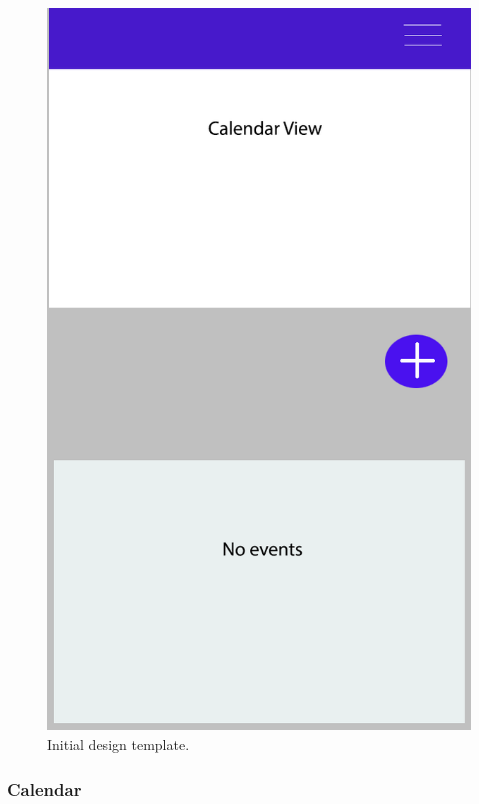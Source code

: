 \documentclass[]{article}
\begin{document}
\begin{flushleft}
\begin{figure}[H]
	\centering\includegraphics[scale=0.13]{img/initial_design.png}
	\caption{Initial design template.}
	\label{fig:initial_design}
\end{figure}



\newpage

\subsubsection{Calendar}


\end{flushleft}
\end{document}
